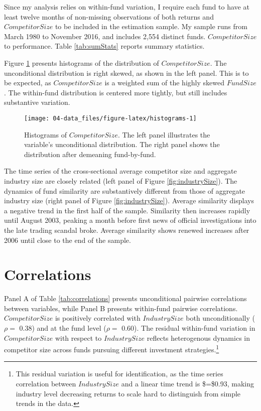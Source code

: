 \documentclass[]{book}
\let\rmarkdownfootnote\footnote%
\def\footnote{\protect\rmarkdownfootnote}
\theoremstyle{definition}
\theoremstyle{definition}
\theoremstyle{definition}
\theoremstyle{remark}
\begin{document}
Since my analysis relies on within-fund variation, I require each fund
to have at least twelve months of non-missing observations of both
returns and \(CompetitorSize\) to be included in the estimation sample.
My sample runs from March 1980 to November 2016, and includes 2,554
distinct funds. \(CompetitorSize\) to performance. Table
\ref{tab:sumStats} reports summary statistics.

Figure \ref{fig:histograms} presents histograms of the distribution of
\(CompetitorSize\). The unconditional distribution is right skewed, as
shown in the left panel. This is to be expected, as \(CompetitorSize\)
is a weighted sum of the highly skewed \(FundSize\). The within-fund
distribution is centered more tightly, but still includes substantive
variation.

\begin{figure}

{\centering \texttt{[image: 04-data\_files/figure-latex/histograms-1]} 

}

\caption{Histograms of $CompetitorSize$. The left panel illustrates the variable's unconditional distribution. The right panel shows the distribution after demeaning fund-by-fund.}\label{fig:histograms}
\end{figure}

The time series of the cross-sectional average competitor size and
aggregate industry size are closely related (left panel of Figure
\ref{fig:industrySize}). The dynamics of fund similarity are
substantively different from those of aggregate industry size (right
panel of Figure \ref{fig:industrySize}). Average similarity displays a
negative trend in the first half of the sample. Similarity then
increases rapidly until August 2003, peaking a month before first news
of official investigations into the late trading scandal broke. Average
similarity shows renewed increases after 2006 until close to the end of
the sample.

\hypertarget{correlations}{%
\section{Correlations}\label{correlations}}

Panel A of Table \ref{tab:correlations} presents unconditional pairwise
correlations between variables, while Panel B presents within-fund
pairwise correlations. \(CompetitorSize\) is positively correlated with
\(IndustrySize\) both unconditionally (\(\rho=\) 0.38) and at the fund
level (\(\rho=\) 0.60). The residual within-fund variation in
\(CompetitorSize\) with respect to \(IndustrySize\) reflects
heterogenous dynamics in competitor size across funds pursuing different
investment strategies.\footnote{This residual variation is useful for
  identification, as the time series correlation between
  \(IndustrySize\) and a linear time trend is \$\rho=\$0.93, making
  industry level decreasing returns to scale hard to distinguish from
  simple trends in the data.}
\end{document}
